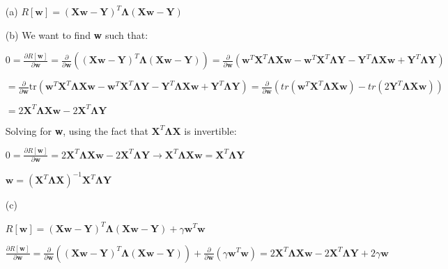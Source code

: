 \documentclass[11pt]{exam}
\theoremstyle{quest}
\begin{document}
\begin{itemize}
\item[(a)]
$ R[\textbf{w}] = (\textbf{X}\textbf{w} - \textbf{Y})^T \boldsymbol{\Lambda}(\textbf{X}\textbf{w}-\textbf{Y})$

\item[(b)] We want to find \textbf{w} such that:

$0 = \frac{\partial R[\textbf{w}]}{\partial \textbf{w}}=\frac{\partial}{\partial \textbf{w}}\left((\textbf{X}\textbf{w} - \textbf{Y})^T \boldsymbol{\Lambda}(\textbf{X}\textbf{w}-\textbf{Y})\right) 
= 
\frac{\partial}{\partial \textbf{w}}\left(\textbf{w}^T\textbf{X}^T\boldsymbol{\Lambda}\textbf{X}\textbf{w} - \textbf{w}^T\textbf{X}^T\boldsymbol{\Lambda}\textbf{Y} - \textbf{Y}^T\boldsymbol{\Lambda}\textbf{X}\textbf{w} + \textbf{Y}^T\boldsymbol{\Lambda}\textbf{Y}\right)
$

$
=
\frac{\partial}{\partial \textbf{w}}\text{tr}\left(\textbf{w}^T\textbf{X}^T\boldsymbol{\Lambda}\textbf{X}\textbf{w} - \textbf{w}^T\textbf{X}^T\boldsymbol{\Lambda}\textbf{Y} - \textbf{Y}^T\boldsymbol{\Lambda}\textbf{X}\textbf{w} + \textbf{Y}^T\boldsymbol{\Lambda}\textbf{Y}\right)
=
\frac{\partial}{\partial \textbf{w}}\left(tr(\textbf{w}^T\textbf{X}^T\boldsymbol{\Lambda}\textbf{X}\textbf{w})-tr(2\textbf{Y}^T\boldsymbol{\Lambda}\textbf{X}\textbf{w})\right)
$

$
=
2\textbf{X}^T\boldsymbol{\Lambda}\textbf{X}\textbf{w} - 2\textbf{X}^T\boldsymbol{\Lambda}\textbf{Y}
$

Solving for \textbf{w}, using the fact that $\textbf{X}^T\boldsymbol{\Lambda}\textbf{X}$ is invertible:

$0 = \frac{\partial R[\textbf{w}]}{\partial \textbf{w}}
= 2\textbf{X}^T\boldsymbol{\Lambda}\textbf{X}\textbf{w} - 2\textbf{X}^T\boldsymbol{\Lambda}\textbf{Y}
\rightarrow\textbf{X}^T\boldsymbol{\Lambda}\textbf{X}\textbf{w} = \textbf{X}^T\boldsymbol{\Lambda}\textbf{Y}
$

$\textbf{w} = (\textbf{X}^T\boldsymbol{\Lambda}\textbf{X})^{-1}  \textbf{X}^T\boldsymbol{\Lambda}\textbf{Y}$

\item[(c)] 

$ R[\textbf{w}] = (\textbf{X}\textbf{w} - \textbf{Y})^T \boldsymbol{\Lambda}(\textbf{X}\textbf{w}-\textbf{Y}) + \gamma\textbf{w}^T\textbf{w}$

$\frac{\partial R[\textbf{w}]}{\partial \textbf{w}} = \frac{\partial }{\partial \textbf{w}}((\textbf{X}\textbf{w} - \textbf{Y})^T \boldsymbol{\Lambda}(\textbf{X}\textbf{w}-\textbf{Y})) + \frac{\partial }{\partial \textbf{w}}(\gamma\textbf{w}^T\textbf{w})
= 
2\textbf{X}^T\boldsymbol{\Lambda}\textbf{X}\textbf{w} - 2\textbf{X}^T\boldsymbol{\Lambda}\textbf{Y} + 2\gamma\textbf{w}
$


\end{itemize}
\end{document}
